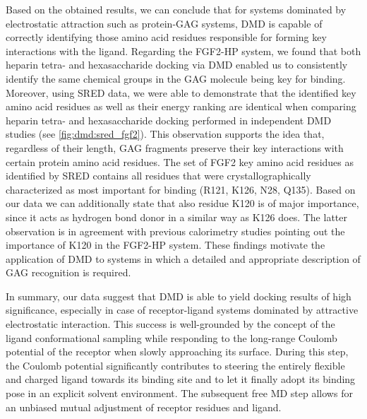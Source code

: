 Based on the obtained results, we can conclude that for systems dominated by
electrostatic attraction such as protein-GAG systems, DMD is capable of
correctly identifying those amino acid residues responsible for forming key
interactions with the ligand. Regarding the FGF2-HP system, we found that both
heparin tetra- and hexasaccharide docking via DMD enabled us to consistently
identify the same chemical groups in the GAG molecule being key for binding.
Moreover, using SRED data, we were able to demonstrate that the identified key
amino acid residues as well as their energy ranking are identical when comparing
heparin tetra- and hexasaccharide docking performed in independent DMD studies
(see \cref{fig:dmd:sred_fgf2}). This observation supports the idea that,
regardless of their length, GAG fragments preserve their key interactions with
certain protein amino acid residues. The set of FGF2 key amino acid residues as
identified by SRED contains all residues that were crystallographically
characterized as most important for binding (R121, K126, N28,
Q135){\cite{faham_heparin_1996}}. Based on our data we can additionally state
that also residue K120 is of major importance, since it acts as hydrogen bond
donor in a similar way as K126 does. The latter observation is in agreement with
previous calorimetry studies pointing out the importance of K120 in the FGF2-HP
system{\cite{thompson_1994_fgf2_heparin}}. These findings motivate the
application of DMD to systems in which a detailed and appropriate description of
GAG recognition is required.

\vspace{1.5cm} In summary, our data suggest that DMD is able to yield docking
results of high significance, especially in case of receptor-ligand systems
dominated by attractive electrostatic interaction. This success is well-grounded
by the concept of the ligand conformational sampling while responding to the
long-range Coulomb potential of the receptor when slowly approaching its
surface. During this step, the Coulomb potential significantly contributes to
steering the entirely flexible and charged ligand towards its binding site and
to let it finally adopt its binding pose in an explicit solvent environment. The
subsequent free MD step allows for an unbiased mutual adjustment of receptor
residues and ligand.

